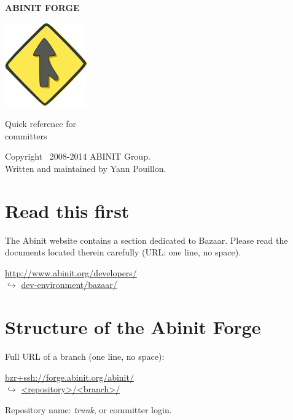 \documentclass[tumble,foldmark,a4paper]{leaflet}
\begin{document}
\begin{center}
{\Large {\bf ABINIT FORGE}}

\vspace{32mm}

\includegraphics{bzr-logo}

\vspace{24mm}

{\Huge Quick reference for \\[0.5em] committers}

\vspace{40mm}

Copyright \textcopyright\ 2008-2014 ABINIT Group. \\
Written and maintained by Yann Pouillon.
\end{center}

\newpage

\section*{Read this first}

The Abinit website contains a section dedicated to Bazaar. Please read
the documents located therein carefully (URL: one line, no space).
\begin{center}
 \url{http://www.abinit.org/developers/} \\
 $\hookrightarrow$ \url{dev-environment/bazaar/}
\end{center}

\section*{Structure of the Abinit Forge}

Full URL of a branch (one line, no space):
\begin{center}
 \url{bzr+ssh://forge.abinit.org/abinit/} \\
 $\hookrightarrow$ \url{<repository>/<branch>/}
\end{center}

Repository name: \textit{trunk}, or committer login. \\
\end{document}
